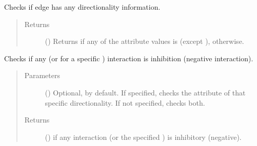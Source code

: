 \documentclass[letterpaper,10pt,english]{sphinxmanual}
\begin{document}
\begin{fulllineitems}
\begin{fulllineitems}
\label{\detokenize{reference:pypath.main.Direction.is_directed}}
Checks if edge has any directionality information.
\begin{quote}\begin{description}
\item[{Returns}] \leavevmode
() \textendash{} Returns  if any of the 
attribute values is  (except ),
 otherwise.

\end{description}\end{quote}

\end{fulllineitems}


\begin{fulllineitems}
\label{\detokenize{reference:pypath.main.Direction.is_inhibition}}
Checks if any (or for a specific ) interaction is
inhibition (negative interaction).
\begin{quote}\begin{description}
\item[{Parameters}] \leavevmode
{} () \textendash{} Optional,  by default. If specified, checks the
 attribute of that specific
directionality. If not specified, checks both.

\item[{Returns}] \leavevmode
() \textendash{}  if any interaction (or the specified
) is inhibitory (negative).

\end{description}\end{quote}

\end{fulllineitems}


\end{fulllineitems}
\end{document}
